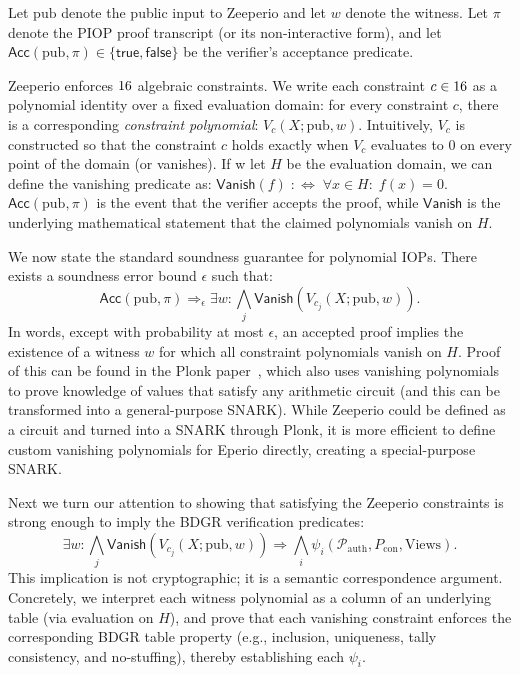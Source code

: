 Let $\mathrm{pub}$ denote the public input to Zeeperio and let $w$ denote the witness. Let $\pi$ denote the PIOP proof transcript (or its non-interactive form), and let $\mathsf{Acc}(\mathrm{pub},\pi)\in\{\mathsf{true},\mathsf{false}\}$ be the verifier’s acceptance predicate.

Zeeperio enforces $16$ algebraic constraints. We write each constraint $c\in16$ as a polynomial identity over a fixed evaluation domain: for every constraint $c$, there is a corresponding \emph{constraint polynomial}: $V_{c}(X;\mathrm{pub},w)$. Intuitively, $V_c$ is constructed so that the constraint $c$ holds exactly when $V_c$ evaluates to $0$ on every point of the domain (or vanishes). If w let $H$ be the evaluation domain, we can define the vanishing predicate as: $\mathsf{Vanish}(f)\;:\Leftrightarrow\;\forall x\in H:\; f(x)=0$. $\mathsf{Acc}(\mathrm{pub},\pi)$ is the event that the verifier accepts the proof, while $\mathsf{Vanish}$ is the underlying mathematical statement that the claimed polynomials vanish on $H$.

We now state the standard soundness guarantee for polynomial IOPs. There exists a soundness error bound $\epsilon$ such that:
\[
\mathsf{Acc}(\mathrm{pub},\pi)\Rightarrow_{\epsilon}\exists w:\bigwedge_j \mathsf{Vanish}\!\left(V_{c_j}(X;\mathrm{pub},w)\right).
\]
In words, except with probability at most $\epsilon$, an accepted proof implies the existence of a witness $w$ for which all constraint polynomials vanish on $H$. Proof of this can be found in the Plonk paper~\cite{GWC19}, which also uses vanishing polynomials to prove knowledge of values that satisfy any arithmetic circuit (and this can be transformed into a general-purpose SNARK). While Zeeperio could be defined as a circuit and turned into a SNARK through Plonk, it is more efficient to define custom vanishing polynomials for Eperio directly, creating a special-purpose SNARK. 

Next we turn our attention to showing that satisfying the Zeeperio constraints is strong enough to imply the BDGR verification predicates:
\[
\exists w:\bigwedge_j \mathsf{Vanish}\!\left(V_{c_j}(X;\mathrm{pub},w)\right)\Rightarrow \bigwedge_i \psi_i(\mathcal{P}_{\mathrm{auth}},P_{\mathrm{con}},\mathrm{Views}).
\]
This implication is not cryptographic; it is a semantic correspondence argument. Concretely, we interpret each witness polynomial as a column of an underlying table (via evaluation on $H$), and prove that each vanishing constraint enforces the corresponding BDGR table property (e.g., inclusion, uniqueness, tally consistency, and no-stuffing), thereby establishing each $\psi_i$.

